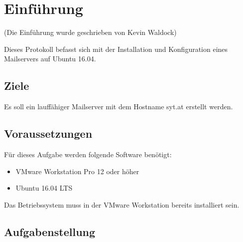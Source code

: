 

\section{Einführung}
(Die Einführung wurde geschrieben von Kevin Waldock)

Dieses Protokoll befasst sich mit der Installation und Konfiguration eines Mailservers auf Ubuntu 16.04. 

\subsection{Ziele}
Es soll ein lauffähiger Mailserver mit dem Hostname syt.at erstellt werden. 

\subsection{Voraussetzungen}
Für dieses Aufgabe werden folgende Software benötigt:

\begin{itemize}
	\item VMware Workstation Pro 12 oder höher
	\item Ubuntu 16.04 LTS
\end{itemize}

Das Betriebssystem muss in der VMware Workstation bereits installiert sein.

\subsection{Aufgabenstellung}


\clearpage
